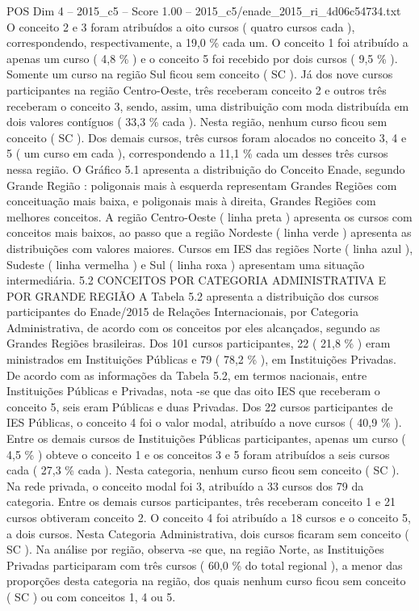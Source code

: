 \begin{textsample}{POS Dim 4 – 2015\_c5 – Score 1.00 – 2015\_c5/enade\_2015\_ri\_4d06c54734.txt}
O conceito 2 e 3 foram atribuídos a oito cursos ( quatro cursos cada ), correspondendo, respectivamente, a 19,0 \% cada um.
O conceito 1 foi atribuído a apenas um curso ( 4,8 \% ) e o conceito 5 foi recebido por dois cursos ( 9,5 \% ).
Somente um curso na região Sul ficou sem conceito ( SC ).
Já dos nove cursos participantes na região Centro-Oeste, três receberam conceito 2 e outros três receberam o conceito 3, sendo, assim, uma distribuição com moda distribuída em dois valores contíguos ( 33,3 \% cada ).
Nesta região, nenhum curso ficou sem conceito ( SC ).
Dos demais cursos, três cursos foram alocados no conceito 3, 4 e 5 ( um curso em cada ), correspondendo a 11,1 \% cada um desses três cursos nessa região.
O Gráfico 5.1 apresenta a distribuição do Conceito Enade, segundo Grande Região : poligonais mais à esquerda representam Grandes Regiões com conceituação mais baixa, e poligonais mais à direita, Grandes Regiões com melhores conceitos.
A região Centro-Oeste ( linha preta ) apresenta os cursos com conceitos mais baixos, ao passo que a região Nordeste ( linha verde ) apresenta as distribuições com valores maiores.
Cursos em IES das regiões Norte ( linha azul ), Sudeste ( linha vermelha ) e Sul ( linha roxa ) apresentam uma situação intermediária. 5.2 CONCEITOS POR CATEGORIA ADMINISTRATIVA E POR GRANDE REGIÃO A Tabela 5.2 apresenta a distribuição dos cursos participantes do Enade/2015 de Relações Internacionais, por Categoria Administrativa, de acordo com os conceitos por eles alcançados, segundo as Grandes Regiões brasileiras.
Dos 101 cursos participantes, 22 ( 21,8 \% ) eram ministrados em Instituições Públicas e 79 ( 78,2 \% ), em Instituições Privadas.
De acordo com as informações da Tabela 5.2, em termos nacionais, entre Instituições Públicas e Privadas, nota -se que das oito IES que receberam o conceito 5, seis eram Públicas e duas Privadas.
Dos 22 cursos participantes de IES Públicas, o conceito 4 foi o valor modal, atribuído a nove cursos ( 40,9 \% ).
Entre os demais cursos de Instituições Públicas participantes, apenas um curso ( 4,5 \% ) obteve o conceito 1 e os conceitos 3 e 5 foram atribuídos a seis cursos cada ( 27,3 \% cada ).
Nesta categoria, nenhum curso ficou sem conceito ( SC ).
Na rede privada, o conceito modal foi 3, atribuído a 33 cursos dos 79 da categoria.
Entre os demais cursos participantes, três receberam conceito 1 e 21 cursos obtiveram conceito 2.
O conceito 4 foi atribuído a 18 cursos e o conceito 5, a dois cursos.
Nesta Categoria Administrativa, dois cursos ficaram sem conceito ( SC ).
Na análise por região, observa -se que, na região Norte, as Instituições Privadas participaram com três cursos ( 60,0 \% do total regional ), a menor das proporções desta categoria na região, dos quais nenhum curso ficou sem conceito ( SC ) ou com conceitos 1, 4 ou 5.

\end{textsample}
